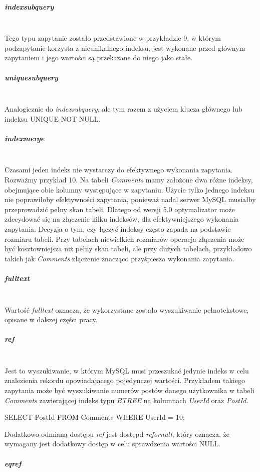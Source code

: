 \subparagraph{index\textunderscore subquery}\leavevmode\\
Tego typu zapytanie zostało przedstawione w przykładzie 9, w którym podzapytanie korzysta z nieunikalnego indeksu, jest wykonane przed głównym zapytaniem i jego wartości są przekazane do niego jako stałe.
\subparagraph{unique\textunderscore subquery}\leavevmode\\
Analogicznie do \textit{index\textunderscore subquery}, ale tym razem z użyciem klucza głównego lub indeksu UNIQUE NOT NULL.
\subparagraph{index\textunderscore merge}\leavevmode\\
Czasami jeden indeks nie wystarczy do efektywnego wykonania zapytania. Rozważmy przykład 10. Na tabeli \textit{Comments} mamy założone dwa różne indeksy, obejmujące obie kolumny występujące w zapytaniu. Użycie tylko jednego indeksu nie poprawiłoby efektywności zapytania, ponieważ nadal serwer MySQL musiałby przeprowadzić pełny skan tabeli. Dlatego od wersji 5.0 optymalizator może zdecydować się na złączenie kilku indeksów, dla efektywniejszego wykonania zapytania. Decyzja o tym, czy łączyć indeksy często zapada na podstawie rozmiaru tabeli. Przy tabelach niewielkich rozmiarów operacja złączenia może być kosztowniejsza niż pełny skan tabeli, ale przy dużych tabelach, przykładowo takich jak \textit{Comments} złączenie znacząco przyśpiesza wykonania zapytania. 
\subparagraph{fulltext}\leavevmode\\
Wartość \textit{fulltext} oznacza, że wykorzystane zostało wyszukiwanie pełnotekstowe, opisane w dalszej części pracy.

\subparagraph{ref}\leavevmode\\
Jest to wyszukiwanie, w którym MySQL musi przeszukać jedynie indeks w celu znalezienia rekordu opowiadającego pojedynczej wartości.
Przykładem takiego zapytania może być wyszukiwanie numerów postów danego użytkownika w tabeli \textit{Comments} zawierającej indeks typu \textit{BTREE} na kolumnach \textit{UserId} oraz \textit{PostId}.

\begin{spverbatim}
	SELECT PostId FROM Comments WHERE UserId = 10;
\end{spverbatim}
Dodatkowo odmianą dostępu \textit{ref} jest dostępd \textit{ref\textunderscore or\textunderscore null}, który oznacza, że wymagany jest dodatkowy dostęp w celu sprawdzenia wartości NULL.


\subparagraph{eq\textunderscore ref}\leavevmode\\

